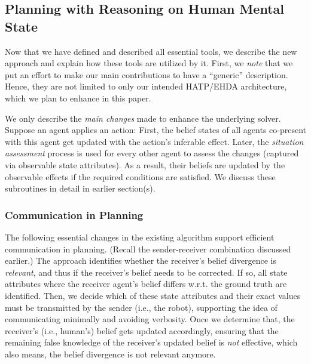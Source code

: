 \documentclass[letterpaper]{article} %
\begin{document}
% 



\subsection{Planning with Reasoning on Human Mental State }
Now that we have defined and described all essential tools, we describe the new approach and explain how these tools are utilized by it. 
First, we \textit{note} that we put an effort to make our main contributions to have a ``generic'' description. Hence, they are not limited to only our intended HATP/EHDA architecture, which we plan to enhance in this paper.

We only describe the \textit{main changes} made to enhance the underlying solver. 
Suppose an agent applies an action: First, the belief states of all agents co-present with this agent get updated with the action's inferable effect. Later, the \textit{situation assessment} process is used for every other agent to assess the changes (captured via observable state attributes). As a result, their beliefs are updated by the observable effects if the required conditions are satisfied. We discuss these subroutines in detail in earlier section(s).

\subsubsection{Communication in Planning}
The following essential changes in the existing algorithm support efficient communication in planning. 
(Recall the sender-receiver combination discussed earlier.) The approach identifies whether the receiver's belief divergence is \textit{relevant}, and thus if the receiver's belief needs to be corrected.
If so, all state attributes where the receiver agent's belief differs w.r.t. the ground truth are identified. Then, we decide which of these state attributes and their exact values must be transmitted by the sender (i.e., the robot), supporting the idea of communicating minimally and avoiding verbosity. Once we determine that, the receiver's (i.e., human's) belief gets updated accordingly, ensuring that the remaining false knowledge of the receiver's updated belief is \textit{not} effective, which also means, the belief divergence is not relevant anymore. 
    
\end{document}
